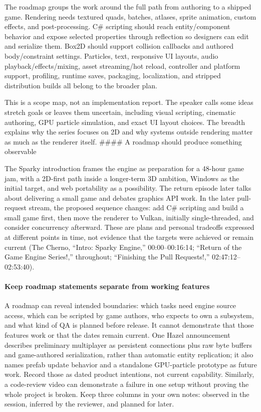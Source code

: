 The roadmap groups the work around the full path from authoring to a shipped game. Rendering needs textured quads, batches, atlases, sprite animation, custom effects, and post-processing. C\# scripting should reach entity/component behavior and expose selected properties through reflection so designers can edit and serialize them. Box2D should support collision callbacks and authored body/constraint settings. Particles, text, responsive UI layouts, audio playback/effects/mixing, asset streaming/hot reload, controller and platform support, profiling, runtime saves, packaging, localization, and stripped distribution builds all belong to the broader plan.

This is a scope map, not an implementation report. The speaker calls some ideas stretch goals or leaves them uncertain, including visual scripting, cinematic authoring, GPU particle simulation, and exact UI layout choices. The breadth explains why the series focuses on 2D and why systems outside rendering matter as much as the renderer itself. \#\#\#\# A roadmap should produce something observable

The Sparky introduction frames the engine as preparation for a 48-hour game jam, with a 2D-first path inside a longer-term 3D ambition, Windows as the initial target, and web portability as a possibility. The return episode later talks about delivering a small game and debates graphics API work. In the later pull-request stream, the proposed sequence changes: add C\# scripting and build a small game first, then move the renderer to Vulkan, initially single-threaded, and consider concurrency afterward. These are plans and personal tradeoffs expressed at different points in time, not evidence that the targets were achieved or remain current (The Cherno, ``Intro: Sparky Engine,'' 00:00--00:16:14; ``Return of the Game Engine Series!,'' throughout; ``Finishing the Pull Requests!,'' 02:47:12--02:53:40).

\paragraph{Keep roadmap statements separate from working features}\label{06-engine-ii-ch041-keep-roadmap-statements-separate-from-working-features}

\hypertarget{06-engine-ii-ch041-keep-roadmap-statements-separate-from-working-features}{}

A roadmap can reveal intended boundaries: which tasks need engine source access, which can be scripted by game authors, who expects to own a subsystem, and what kind of QA is planned before release. It cannot demonstrate that those features work or that the dates remain current. One Hazel announcement describes preliminary multiplayer as persistent connections plus raw byte buffers and game-authored serialization, rather than automatic entity replication; it also names prefab update behavior and a standalone GPU-particle prototype as future work. Record those as dated product intentions, not current capability. Similarly, a code-review video can demonstrate a failure in one setup without proving the whole project is broken. Keep three columns in your own notes: observed in the session, inferred by the reviewer, and planned for later.

